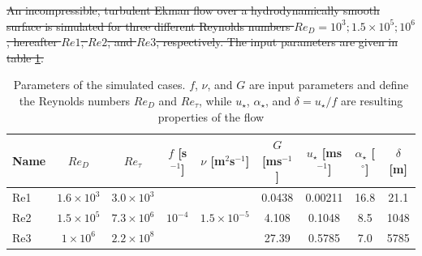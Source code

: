 \documentclass[a4paper,11pt]{article}
\providecommand{\DIFdel}[1]{{\protect\color{red}\sout{#1}}}                      %
\providecommand{\DIFdelbegin}{} %
\providecommand{\DIFdelend}{} %
\begin{document}
\DIFdelbegin \DIFdel{An incompressible, turbulent Ekman flow over a hydrodynamically smooth surface is simulated for three different Reynolds numbers $Re_D = 10^3;1.5\times 10^5;10^6$, hereafter $Re1$, $Re2$, and $Re3$, respectively. The input parameters are given in table \ref{simulation_parameters}.
}%

\DIFdelend \begin{table}
	\centering
	\caption{Parameters of the simulated cases. $f$, $\nu$, and $G$ are input parameters and define the Reynolds numbers $Re_D$ and $Re_\tau$, while $u_\star$, $\alpha_\star$, and $\delta = u_\star/f$ are resulting properties of the flow}
	\begin{tabular}{lcccccccc}
          \toprule  
	  Name & $Re_D$ & $Re_\tau$ & $f$ [s$^{-1}$] & $\nu$ [m$^2$s$^{-1}$] & $G$ [ms$^{-1}$] & $u_\star$ [ms$^{-1}$] & $\alpha_\star$ [$^\circ$]& $\delta$ [m] \\
          \midrule
	  Re1 & $1.6\times10^3$ & $3.0\times10^3$ &  &  & 0.0438 & 0.00211 & 16.8 & 21.1 \\
	  Re2 & $1.5\times10^5$ & $7.3\times10^6$ & $10^{-4}$ & $1.5\times10^{-5}$ & 4.108 & 0.1048 & 8.5 & 1048\\
	  Re3 & $1\times10^6$ & $2.2\times10^8$ &  &  & 27.39 & 0.5785 & 7.0 & 5785 \\
          \bottomrule
	\end{tabular}
	\label{simulation_parameters}
\end{table}
\DIFdelbegin %
\end{document}
